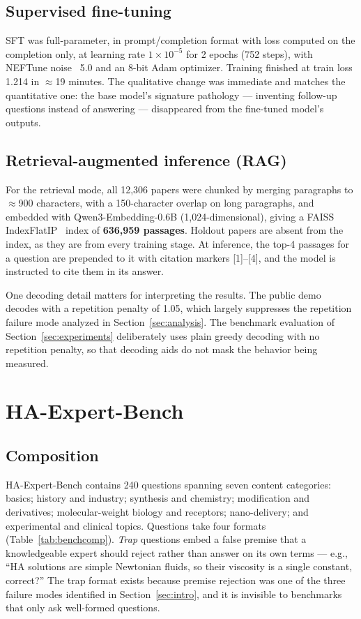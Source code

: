 \documentclass[11pt]{article}
\begin{document}
\subsection{Supervised fine-tuning}
\label{sec:sft-train}

SFT was full-parameter, in prompt/completion format with loss computed on
the completion only, at learning rate $1\times10^{-5}$ for 2 epochs
(752 steps), with NEFTune noise~\cite{neftune} 5.0 and an 8-bit Adam
optimizer. Training finished at train loss 1.214 in $\approx$19 minutes. The
qualitative change was immediate and matches the quantitative one: the
base model's signature pathology --- inventing follow-up questions instead
of answering --- disappeared from the fine-tuned model's outputs.

\subsection{Retrieval-augmented inference (RAG)}
\label{sec:rag}

For the retrieval mode, all 12,306 papers were chunked by merging
paragraphs to $\approx$900 characters, with a 150-character overlap on
long paragraphs, and embedded with Qwen3-Embedding-0.6B
(1,024-dimensional), giving a FAISS IndexFlatIP~\cite{faiss} index of
\textbf{636,959 passages}. Holdout papers are absent from the index, as
they are from every training stage. At inference, the top-4 passages for
a question are prepended to it with citation markers [1]--[4], and the
model is instructed to cite them in its answer.

One decoding detail matters for interpreting the results. The public demo
decodes with a repetition penalty of 1.05, which largely suppresses the
repetition failure mode analyzed in Section~\ref{sec:analysis}. The
benchmark evaluation of Section~\ref{sec:experiments} deliberately uses
plain greedy decoding with no repetition penalty, so that decoding aids do
not mask the behavior being measured.

\section{HA-Expert-Bench}
\label{sec:bench}

\subsection{Composition}

HA-Expert-Bench contains 240 questions spanning seven content categories:
basics; history and industry; synthesis and chemistry; modification and
derivatives; molecular-weight biology and receptors; nano-delivery; and
experimental and clinical topics. Questions take four formats
(Table~\ref{tab:benchcomp}). \emph{Trap} questions embed a false premise
that a knowledgeable expert should reject rather than answer on its own
terms --- e.g., ``HA solutions are simple Newtonian fluids, so their
viscosity is a single constant, correct?'' The trap format exists because
premise rejection was one of the three failure modes identified in
Section~\ref{sec:intro}, and it is invisible to benchmarks that only ask
well-formed questions.
\end{document}
